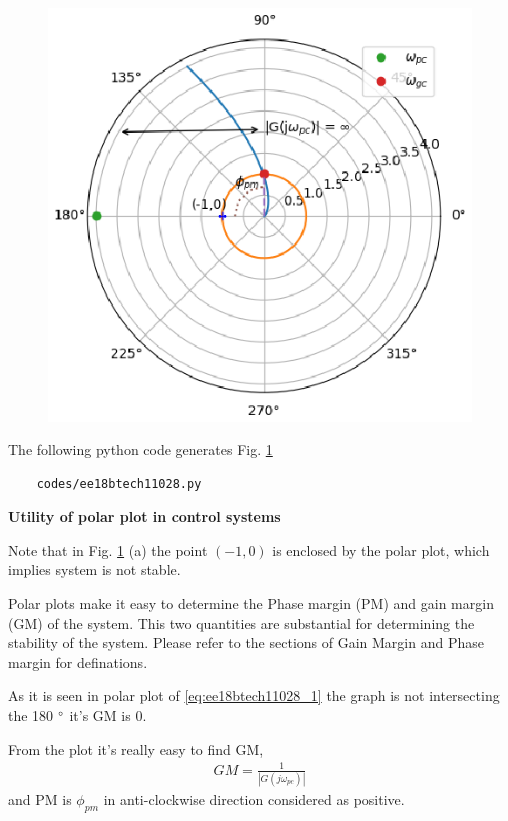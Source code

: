 \begin{enumerate}[label=\thesection.\arabic*.,ref=\thesection.\theenumi]
\begin{figure}[!h]
    \includegraphics[width=\columnwidth]{./figs/ee18btech11028/ee18btech11028.eps}
  \caption{}
  \label{fig:ee18btech11028_fig1}
\end{figure}

The following python code generates  Fig. \ref{fig:ee18btech11028_fig1}
\begin{lstlisting}
    codes/ee18btech11028.py
\end{lstlisting}
\textbf{Utility of polar plot in control systems}

Note that in Fig. \ref{fig:ee18btech11028_fig1} (a) the point $(-1,0)$ is enclosed by the polar plot,
which implies system is not stable.


Polar plots make it easy to determine the Phase margin (PM) and gain margin (GM) of the system.
This two quantities are substantial for determining the stability of the system.
Please refer to the sections of Gain Margin and Phase margin for definations.

As it is seen in polar plot of \eqref{eq:ee18btech11028_1} the graph is not intersecting the 180 $\degree$
it's GM is 0.





From the plot it's really easy to find GM,
\begin{align}
    GM = \frac{1}{|G(j\omega_{pc})|}
    \label{eq:ee18btech11028_6}
\end{align}
and PM is $\phi_{pm}$ in anti-clockwise direction considered as positive.


\end{enumerate}
